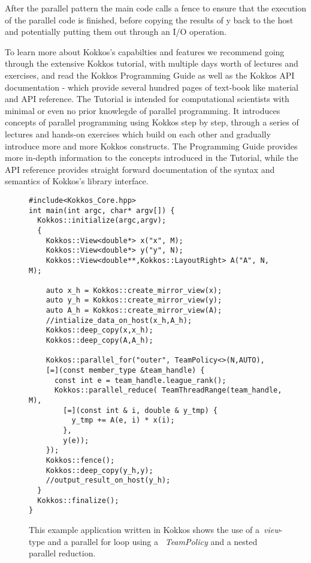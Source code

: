 After the parallel pattern the main code calls a fence to ensure that the execution of the parallel code is finished, before copying the results of y back to the host and potentially putting them out through an I/O operation.

To learn more about Kokkos's capabilties and features we recommend going through the extensive Kokkos tutorial, with multiple days worth of lectures and exercises, and read the Kokkos Programming Guide as well as the Kokkos API documentation - which provide several hundred pages of text-book like material and API reference.
The Tutorial is intended for computational scientists with minimal or even no prior knowlegde of parallel programming.
It introduces concepts of parallel programming using Kokkos step by step, through a series of lectures and hands-on exercises which build on each other and gradually introduce more and more Kokkos constructs.
The Programming Guide provides more in-depth information to the concepts introduced in the Tutorial, while the API reference provides straight forward documentation of the syntax and semantics of Kokkos's library interface.

\begin{figure}
\begin{small}
\begin{Verbatim}[frame=leftline]
#include<Kokkos_Core.hpp>
int main(int argc, char* argv[]) {
  Kokkos::initialize(argc,argv);
  {
    Kokkos::View<double*> x("x", M);  
    Kokkos::View<double*> y("y", N);
    Kokkos::View<double**,Kokkos::LayoutRight> A("A", N, M);  

    auto x_h = Kokkos::create_mirror_view(x);
    auto y_h = Kokkos::create_mirror_view(y);
    auto A_h = Kokkos::create_mirror_view(A);
    //intialize_data_on_host(x_h,A_h);
    Kokkos::deep_copy(x,x_h);
    Kokkos::deep_copy(A,A_h);    

    Kokkos::parallel_for("outer", TeamPolicy<>(N,AUTO),
    [=](const member_type &team_handle) {
      const int e = team_handle.league_rank();
      Kokkos::parallel_reduce( TeamThreadRange(team_handle, M),
        [=](const int & i, double & y_tmp) {
          y_tmp += A(e, i) * x(i);
        }, 
        y(e));
    }); 
    Kokkos::fence();
    Kokkos::deep_copy(y_h,y);
    //output_result_on_host(y_h);
  }
  Kokkos::finalize();
}
\end{Verbatim}
\end{small}
\caption{This example application written in Kokkos shows the use of a~\emph{view}-type and a parallel for loop using a ~\emph{TeamPolicy} and a nested parallel reduction. }
\label{fig:KokkosExample}
\end{figure}


